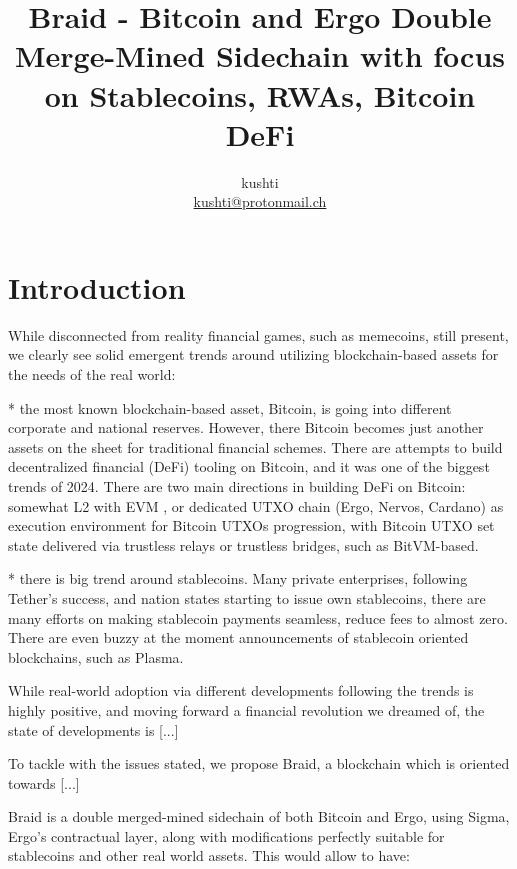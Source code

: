 \documentclass{llncs}   %
\newcommand{\bc}{Braid}
\begin{document}
\title{\bc{} - Bitcoin and Ergo Double Merge-Mined Sidechain with focus on Stablecoins, RWAs, Bitcoin DeFi}

\author{kushti \\ \href{mailto:kushti@protonmail.ch}{kushti@protonmail.ch}}


\maketitle

\begin{abstract}
\end{abstract}

\section{Introduction}

While disconnected from reality financial games, such as memecoins, still present, we clearly see solid emergent trends around utilizing 
blockchain-based assets for the needs of the real world:

* the most known blockchain-based asset, Bitcoin, is going into different corporate and national reserves. However, there Bitcoin becomes just another assets on the sheet for traditional financial schemes. There are attempts to build decentralized financial (DeFi) tooling on Bitcoin, and it was one of the biggest trends of 2024. There are two main directions in building DeFi on Bitcoin: somewhat L2 with EVM , or dedicated UTXO chain (Ergo, Nervos, Cardano) as execution environment for Bitcoin UTXOs progression, with Bitcoin UTXO set state delivered via trustless relays or trustless bridges, such as BitVM-based.

* there is big trend around stablecoins. Many private enterprises, following Tether's success, and nation states starting to issue own stablecoins, there are many efforts on making stablecoin payments seamless, reduce fees to almost zero. There are even buzzy at the moment 
announcements of stablecoin oriented blockchains, such as Plasma. 

While real-world adoption via different developments following the trends is highly positive, and moving forward a financial revolution we dreamed of, the state of developments is [...]


To tackle with the issues stated, we propose \bc{}, a blockchain which is oriented towards [...] 


\bc{} is a double merged-mined sidechain of both Bitcoin and Ergo, using Sigma, Ergo's contractual layer, along with modifications perfectly suitable for stablecoins and other real world assets. This would allow to have:
\end{document}
